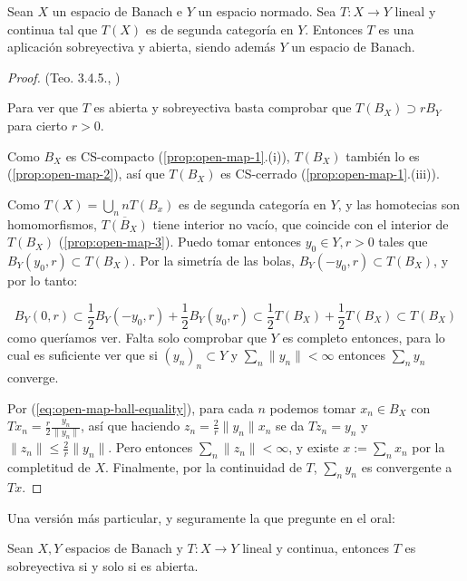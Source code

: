 \begin{theorem}
  \label{th:open-map}
  Sean $X$ un espacio de Banach e $Y$ un espacio normado. Sea $T:X\to Y$ lineal
  y continua tal que $T(X)$ es de segunda categoría en $Y$. Entonces $T$ es una
  aplicación sobreyectiva y abierta, siendo además $Y$ un espacio de Banach.
\end{theorem}

\begin{proof}(Teo. 3.4.5., \cite{cascales2012})

  Para ver que $T$ es abierta y sobreyectiva basta comprobar que $T(B_X)\supset
  rB_Y$ para cierto $r>0$.

  Como $B_X$ es CS-compacto (\autoref{prop:open-map-1}.(i)), $T(B_X)$ también lo es
  (\autoref{prop:open-map-2}), así que $T(B_X)$ es CS-cerrado
  (\autoref{prop:open-map-1}.(iii)).

  Como $T(X)=\bigcup_{n} nT(B_x)$ es de segunda categoría en $Y$, y las
  homotecias son homomorfismos,  $\overline{T(B_X)}$ tiene interior no vacío,
  que coincide con el interior de $T(B_X)$ (\autoref{prop:open-map-3}). Puedo
  tomar entonces $y_0\in Y,r>0$ tales que $B_Y(y_0,r)\subset T(B_X)$. Por la
  simetría de las bolas, $B_Y(-y_0,r)\subset T(B_X)$, y por lo tanto:

  \begin{equation}
    \label{eq:open-map-ball-equality}
    B_Y(0,r) \subset \frac{1}{2}B_Y(-y_{0},r)+\frac{1}{2}B_Y(y_0,r)
    \subset \frac{1}{2}T(B_X)+\frac{1}{2}T(B_X)\subset T(B_X)
  \end{equation}
  como queríamos ver. Falta solo comprobar que $Y$ es completo entonces, para lo
  cual es suficiente ver que si $(y_n)_n\subset Y$ y $\sum_n \|y_n\|<\infty$
  entonces $\sum_ny_n$ converge.

  Por (\autoref{eq:open-map-ball-equality}), para cada $n$ podemos tomar $x_n
  \in B_X$ con $Tx_n=\frac{r}{2}\frac{y_n}{\|y_n\|}$, así que haciendo
  $z_n=\frac{2}{r}\|y_n\|x_n$ se da $Tz_n=y_n$ y $\|z_n\|\le
  \frac{2}{r}\|y_n\|$. Pero entonces $\sum_n \|z_n\|<\infty$, y existe
  $x:=\sum_n x_n$ por la completitud de $X$. Finalmente, por la continuidad de
  $T$, $\sum_n y_n$ es convergente a $Tx$.



\end{proof}

Una versión más particular, y seguramente la que pregunte en el oral:

\begin{corollary}
  \label{cor:open-map}
  Sean $X,Y$ espacios de Banach y $T:X\to Y$ lineal y continua, entonces $T$ es
  sobreyectiva si y solo si es abierta.
\end{corollary}

